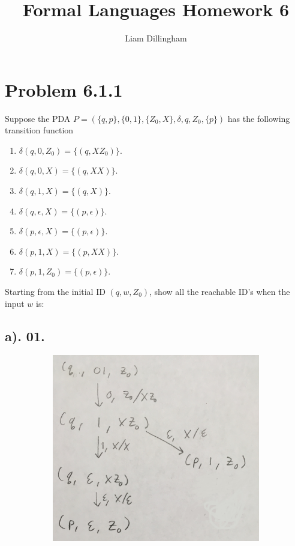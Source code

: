 \documentclass[20pt]{article} %
\title{Formal Languages Homework 6}
\author{Liam Dillingham}
\begin{document}
\maketitle

\section{Problem 6.1.1}
Suppose the PDA $\!P = (\{q, p\}, \{0,1\}, \{Z_0,X\}, \delta, q , Z_0, \{p\})$ has the following transition function
\begin{enumerate}
\item $\delta(q, 0, Z_0) = \{(q, XZ_0)\}$.
\item $\delta(q, 0, X) = \{(q, XX)\}$.
\item $\delta(q, 1, X) = \{(q, X)\}$.
\item $\delta(q, \epsilon, X) = \{(p, \epsilon)\}$.
\item $\delta(p, \epsilon, X) = \{(p, \epsilon)\}$.
\item $\delta(p, 1, X) = \{(p, XX)\}$.
\item $\delta(p, 1, Z_0) = \{(p, \epsilon)\}$.
\end{enumerate}
Starting from the initial ID $(q, w, Z_0)$, show all the reachable ID's when the input $w$ is:
\subsection{a). 01.}
\begin{figure}[!htbp]
  	\centering
   	\begin{subfigure}[p]{0.5\linewidth}
    	\includegraphics[width=\linewidth]{./figures/h7-1.jpg}
   	\end{subfigure}
\end{figure} 
\newpage
\end{document}
